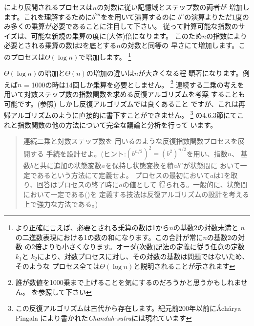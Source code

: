 \noindent
{}により展開されるプロセスは\( n \)の対数に従い記憶域とステップ数の両者が
増加します。これを理解するために\( b^{2n} \)をを用いて演算するのに
\( b^n \)の演算よりただ1度のみ多くの乗算が必要であることに注目して下さい。
従って計算可能な指数のサイズは、可能な新規の乗算の度に(大体)倍になります。
このため\( n \)の指数により必要とされる乗算の数は2を底とする\( n \)の対数と同等の
早さにて増加します。このプロセスは\( \Theta(\log n) \)で増加します。
\footnote{より正確に言えば、必要とされる乗算の数は1から\( n \)の基数2の対数未満と
\( n \)の二進数表現における1の数の和になります。この合計が常に\( n \)の基数2の対数
の2倍よりも小さくなります。オーダ(次数)記法の定義に従う任意の定数 \( k_1 \)と
\( k_2 \)により、対数プロセスに対し、その対数の基数は問題ではないため、そのような
プロセス全ては\( \Theta(\log n) \)と説明されることが示されます}



\( \Theta(\log n) \)の増加と\( \Theta(n) \)の増加の違いは\( n \)が大きくなる程
顕著になります。例えば\( n \) = 1000の時は14回しか乗算を必要としません。
\footnote{誰が数値を1000乗まで上げることを気にするのだろうかと思うかもしれません。
を参照して下さい}
連続する二乗の考えを用いて対数ステップ数の指数関数を求める反復アルゴリズムを考案
することも可能です。(参照) しかし反復アルゴリズムでは良くあること
ですが、これは再帰アルゴリズムのように直接的に書下すことができません。
\footnote{この反復アルゴリズムは古代から存在します。紀元前200年以前に\'Ach\'arya Pingala
により書かれた\textit{Chandah-sutra}には現れています}
の4.6.3節にてこれと指数関数の他の方法について完全な議論と分析を行って
います。

\begin{quote}
 連続二乗と対数ステップ数を
用いるのような反復指数関数プロセスを展開する
手続を設計せよ。(ヒント:\( (b^{n / 2})^2 = (b^2)^{n / 2} \)を用い、指数\( n \)、
基数\( b \)と共に追加の状態変数\( a \)を保持し状態変換を積\( ab^n \)が状態間に
おいて一定であるという方法にて定義せよ。
プロセスの最初において\( a \)は1を取り、回答はプロセスの終了時に\( a \)の値として
得られる。一般的に、状態間において一定である()を
定義する技法は反復アルゴリズムの設計を考える上で強力な方法である。)
\end{quote}

